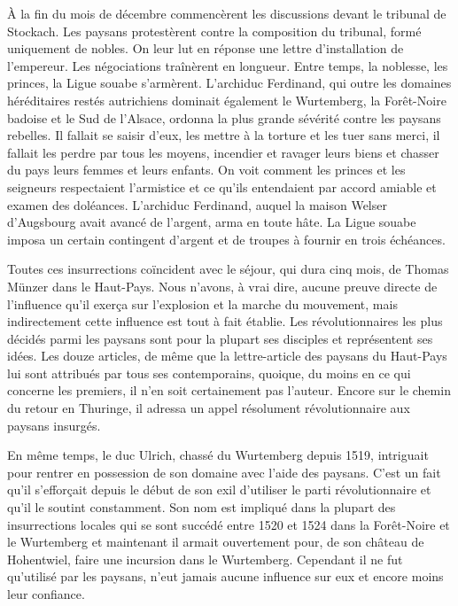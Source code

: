 \documentclass[french,twoside]{book} %
\begin{document}
À la fin du mois de décembre commencèrent les discussions devant le tribunal de Stockach. Les paysans protestèrent contre la composition du tribunal, formé uniquement de nobles. On leur lut en réponse une lettre d’installation de l’empereur. Les négociations traînèrent en longueur. Entre temps, la noblesse, les princes, la Ligue souabe s’armèrent. L’archiduc Ferdinand, qui outre les domaines héréditaires restés autrichiens dominait également le Wurtemberg, la Forêt-Noire badoise et le Sud de l’Alsace, ordonna la plus grande sévérité contre les paysans rebelles. Il fallait se saisir d’eux, les mettre à la torture et les tuer sans merci, il fallait les perdre par tous les moyens, incendier et ravager leurs biens et chasser du pays leurs femmes et leurs enfants. On voit comment les princes et les seigneurs respectaient l’armistice et ce qu’ils entendaient par accord amiable et examen des doléances. L’archiduc Ferdinand, auquel la maison Welser d’Augsbourg avait avancé de l’argent, arma en toute hâte. La Ligue souabe imposa un certain contingent d’argent et de troupes à fournir en trois échéances.\par
Toutes ces insurrections coïncident avec le séjour, qui dura cinq mois, de Thomas Münzer dans le Haut-Pays. Nous n’avons, à vrai dire, aucune preuve directe de l’influence qu’il exerça sur l’explosion et la marche du mouvement, mais indirectement cette influence est tout à fait établie. Les révolutionnaires les plus décidés parmi les paysans sont pour la plupart ses disciples et représentent ses idées. Les douze articles, de même que la lettre-article des paysans du Haut-Pays lui sont attribués par tous ses contemporains, quoique, du moins en ce qui concerne les premiers, il n’en soit certainement pas l’auteur. Encore sur le chemin du retour en Thuringe, il adressa un appel résolument révolutionnaire aux paysans insurgés.\par
En même temps, le duc Ulrich, chassé du Wurtemberg depuis 1519, intriguait pour rentrer en possession de son domaine avec l’aide des paysans. C’est un fait qu’il s’efforçait depuis le début de son exil d’utiliser le parti révolutionnaire et qu’il le soutint constamment. Son nom est impliqué dans la plupart des insurrections locales qui se sont succédé entre 1520 et 1524 dans la Forêt-Noire et le Wurtemberg et maintenant il armait ouvertement pour, de son château de Hohentwiel, faire une incursion dans le Wurtemberg. Cependant il ne fut qu’utilisé par les paysans, n’eut jamais aucune influence sur eux et encore moins leur confiance.\par
\end{document}
